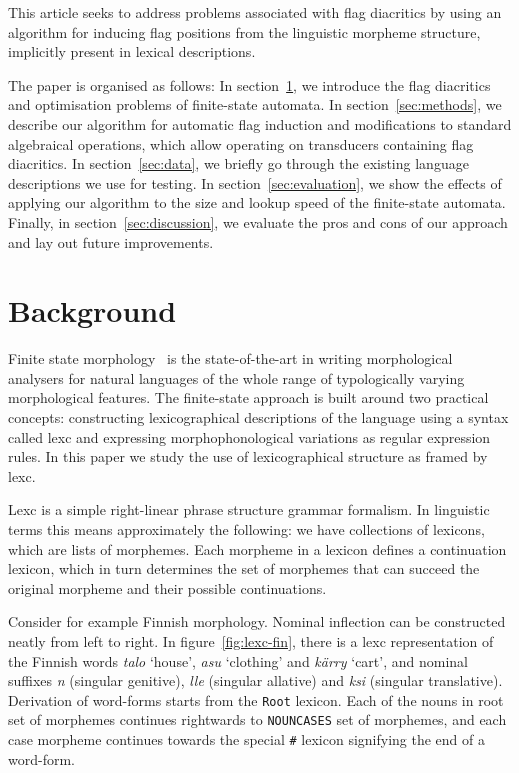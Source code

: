 \documentclass[11pt]{article}
\begin{document}
This article seeks to address problems associated with flag diacritics
by using an algorithm for inducing flag positions from the linguistic
morpheme structure, implicitly present in lexical
descriptions.

The paper is organised as follows: In section~\ref{sec:background}, we
introduce the flag diacritics and optimisation problems of
finite-state automata. In section~\ref{sec:methods}, we describe our
algorithm for automatic flag induction and modifications to standard
algebraical operations, which allow operating on transducers
containing flag diacritics.  In section~\ref{sec:data}, we briefly go
through the existing language descriptions we use for testing. In
section~\ref{sec:evaluation}, we show the effects of applying our
algorithm to the size and lookup speed of the finite-state
automata. Finally, in section~\ref{sec:discussion}, we evaluate the
pros and cons of our approach and lay out future improvements.

\section{Background}
\label{sec:background}

Finite state morphology~\cite{beesley2003finite} is the
state-of-the-art in writing morphological analysers for natural
languages of the whole range of typologically varying morphological
features. The finite-state approach is built around two practical
concepts: constructing lexicographical descriptions of the language
using a syntax called lexc and expressing morphophonological
variations as regular expression rules. In this paper we study the use
of lexicographical structure as framed by lexc. 

Lexc is a simple right-linear phrase structure grammar formalism. In
linguistic terms this means approximately the following: we have
collections of lexicons, which are lists of morphemes. Each morpheme
in a lexicon defines a continuation lexicon, which in turn determines
the set of morphemes that can succeed the original morpheme and their
possible continuations.

Consider for example Finnish morphology. Nominal inflection can be
constructed neatly from left to right. In figure~\ref{fig:lexc-fin},
there is a lexc representation of the Finnish words \emph{talo} `house',
\emph{asu} `clothing' and \emph{kärry} `cart', and nominal suffixes
\emph{n} (singular genitive), \emph{lle} (singular allative) and
\emph{ksi} (singular translative). Derivation of word-forms starts
from the \texttt{Root} lexicon. Each of the nouns in root set of morphemes
continues rightwards to \texttt{NOUNCASES} set of morphemes, and each
case morpheme continues towards the special \texttt{\#} lexicon
signifying the end of a word-form.
\end{document}
